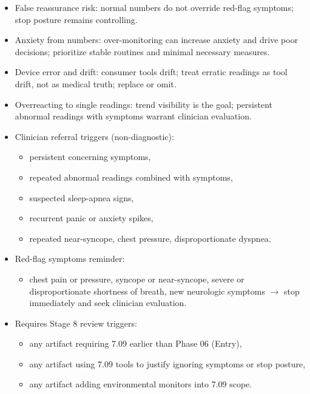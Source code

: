 \documentclass[10pt]{article}
\begin{document}
\begin{itemize}
\item False reassurance risk: normal numbers do not override red-flag symptoms; stop posture remains controlling.
\item Anxiety from numbers: over-monitoring can increase anxiety and drive poor decisions; prioritize stable routines and minimal necessary measures.
\item Device error and drift: consumer tools drift; treat erratic readings as tool drift, not as medical truth; replace or omit.
\item Overreacting to single readings: trend visibility is the goal; persistent abnormal readings with symptoms warrant clinician evaluation.
\item Clinician referral triggers (non-diagnostic):
  \begin{itemize}
  \item persistent concerning symptoms,
  \item repeated abnormal readings combined with symptoms,
  \item suspected sleep-apnea signs,
  \item recurrent panic or anxiety spikes,
  \item repeated near-syncope, chest pressure, disproportionate dyspnea.
  \end{itemize}
\item Red-flag symptoms reminder:
  \begin{itemize}
  \item chest pain or pressure, syncope or near-syncope, severe or disproportionate shortness of breath, new neurologic symptoms $\rightarrow$ stop immediately and seek clinician evaluation.
  \end{itemize}
\item Requires Stage 8 review triggers:
  \begin{itemize}
  \item any artifact requiring 7.09 earlier than Phase 06 (Entry),
  \item any artifact using 7.09 tools to justify ignoring symptoms or stop posture,
  \item any artifact adding environmental monitors into 7.09 scope.
  \end{itemize}
\end{itemize}
\end{document}
